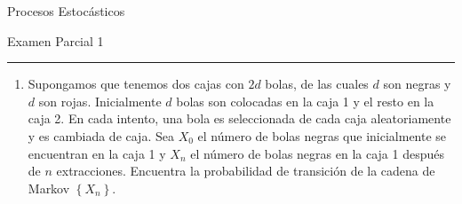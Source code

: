 \documentclass[12pt]{report}
\begin{document}
\begin{center}
    \textsf{\Large Procesos Estocásticos}
    \par\medskip
    \textsf{\large Examen Parcial 1}
    \end{center}
    \hrule
    \par\bigskip

\begin{enumerate}
    \item Supongamos que tenemos dos cajas con $2d$ bolas,  de las cuales $d$ son negras y $d$ son rojas. Inicialmente $d$ bolas son colocadas en la caja 1 y el resto en la caja 2. En cada intento, una bola es seleccionada de cada caja aleatoriamente y es cambiada de caja. Sea $X_0$ el número de bolas negras que inicialmente se encuentran en la caja 1 y $X_n$ el número de bolas negras en la caja 1 después de $n$ extracciones. Encuentra la probabilidad de transición de la cadena de Markov $\left\{X_n\right\}$.


\end{enumerate}
\end{document}
